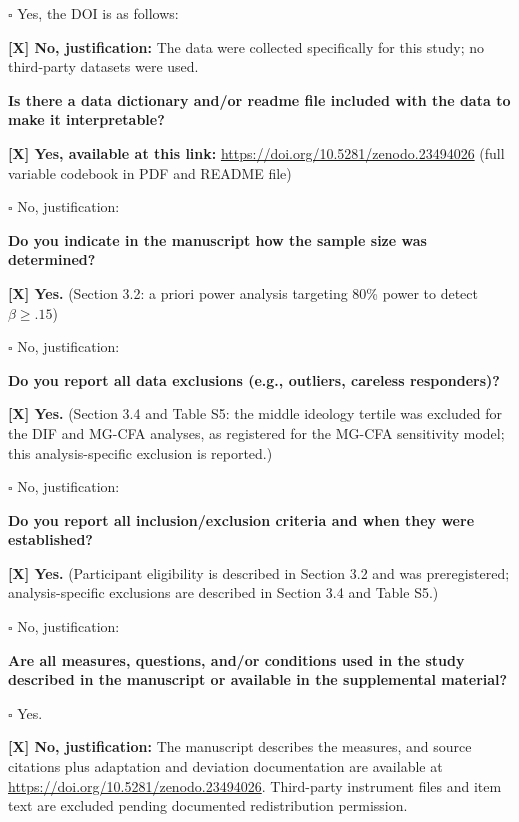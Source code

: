 \documentclass[
  12pt,
]{article}
\begin{document}
\quad $\square$ Yes, the DOI is as follows:

\textbf{[X] No, justification:} The data were collected specifically for this study; no third-party datasets were used.

\bigskip

\textbf{Is there a data dictionary and/or readme file included with the data to make it interpretable?}

\textbf{[X] Yes, available at this link:} \url{https://doi.org/10.5281/zenodo.23494026} (full variable codebook in PDF and README file)

\quad $\square$ No, justification:

\bigskip

\textbf{Do you indicate in the manuscript how the sample size was determined?}

\textbf{[X] Yes.} (Section 3.2: a priori power analysis targeting 80\% power to detect $\beta \geq .15$)

\quad $\square$ No, justification:

\bigskip

\textbf{Do you report all data exclusions (e.g., outliers, careless responders)?}

\textbf{[X] Yes.} (Section 3.4 and Table S5: the middle ideology tertile was excluded for the DIF and MG-CFA analyses, as registered for the MG-CFA sensitivity model; this analysis-specific exclusion is reported.)

\quad $\square$ No, justification:

\bigskip

\textbf{Do you report all inclusion/exclusion criteria and when they were established?}

\textbf{[X] Yes.} (Participant eligibility is described in Section 3.2 and was preregistered; analysis-specific exclusions are described in Section 3.4 and Table S5.)

\quad $\square$ No, justification:

\bigskip

\textbf{Are all measures, questions, and/or conditions used in the study described in the manuscript or available in the supplemental material?}

\quad $\square$ Yes.

\textbf{[X] No, justification:} The manuscript describes the measures, and source citations plus adaptation and deviation documentation are available at \url{https://doi.org/10.5281/zenodo.23494026}. Third-party instrument files and item text are excluded pending documented redistribution permission.
\end{document}
